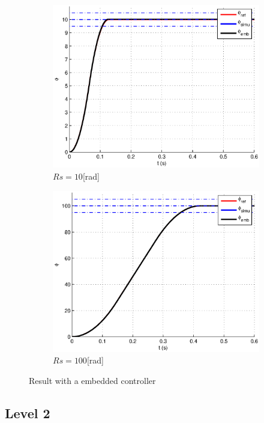 \begin{figure}[ht]
  \centering
  \begin{subfigure}[b]{\linewidth}
   \includegraphics[width=\columnwidth]{fig/embeddedlvl110.eps}
   \caption{$Rs = 10$[rad]}
  \end{subfigure}
  \begin{subfigure}[b]{\linewidth}
  \includegraphics[width=\columnwidth]{fig/embeddedlvl1100.eps}
   \caption{$Rs = 100$[rad]}
  \end{subfigure}

 \caption{Result with a embedded controller}
 \label{embedded}
\end{figure}

\subsection*{Level 2}
